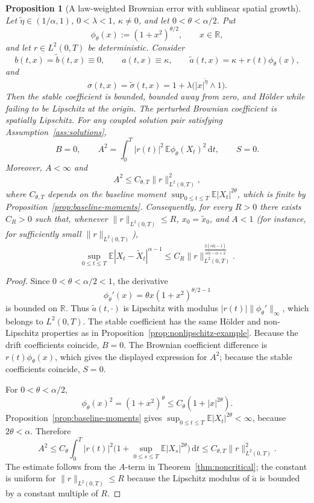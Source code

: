 \documentclass[10pt,a4paper]{amsart}
\newtheorem{proposition}[theorem]{Proposition}
\newcommand{\R}{\mathbb{R}}
\newcommand{\E}{\mathbb{E}}
\newcommand{\1}{\mathbf{1}}
\newcommand{\dd}{\,\mathrm{d}}
\newcommand{\wt}{\tilde}
\begin{document}
\begin{proposition}[A law-weighted Brownian error with sublinear spatial growth]\label{prop:mixed-tail-brownian-error}
Let $\wt\eta\in(1/\alpha,1)$, $0<\lambda<1$, $\kappa\ne0$, and let $0<\theta<\alpha/2$. Put
\[
  \phi_\theta(x):=(1+x^2)^{\theta/2},\qquad x\in\R,
\]
and let $r\in L^2(0,T)$ be deterministic. Consider
\[
  b(t,x)=\wt b(t,x)\equiv0,
  \qquad
  a(t,x)\equiv\kappa,
  \qquad
  \wt a(t,x)=\kappa+r(t)\phi_\theta(x),
\]
and
\[
  \sigma(t,x)=\wt\sigma(t,x)=1+\lambda\bigl(|x|^{\wt\eta}\wedge1\bigr).
\]
Then the stable coefficient is bounded, bounded away from zero, and H\"older while failing to be Lipschitz at the origin. The perturbed Brownian coefficient is spatially Lipschitz. For any coupled solution pair satisfying Assumption~\ref{ass:solutions},
\[
  B=0,
  \qquad
  A^2=\int_0^T |r(t)|^2\,\E \phi_\theta(X_t)^2\dd t,
  \qquad
  S=0.
\]
Moreover, $A<\infty$ and
\[
  A^2\le C_{\theta,T}\|r\|_{L^2(0,T)}^2,
\]
where $C_{\theta,T}$ depends on the baseline moment $\sup_{0\le t\le T}\E|X_t|^{2\theta}$, which is finite by Proposition~\ref{prop:baseline-moments}. Consequently, for every $R>0$ there exists $C_R>0$ such that, whenever $\|r\|_{L^2(0,T)}\le R$, $x_0=\wt x_0$, and $A<1$ (for instance, for sufficiently small $\|r\|_{L^2(0,T)}$),
\[
  \sup_{0\le t\le T}\E|X_t-\wt X_t|^{\alpha-1}
  \le C_R\|r\|_{L^2(0,T)}^{\frac{2(\alpha\wt\eta-1)}{\alpha\wt\eta-\alpha+2}}.
\]
\end{proposition}

\begin{proof}
Since $0<\theta<\alpha/2<1$, the derivative
\[
  \phi_\theta'(x)=\theta x(1+x^2)^{\theta/2-1}
\]
is bounded on $\R$. Thus $\wt a(t,\cdot)$ is Lipschitz with modulus $|r(t)|\|\phi_\theta'\|_\infty$, which belongs to $L^2(0,T)$. The stable coefficient has the same H\"older and non-Lipschitz properties as in Proposition~\ref{prop:nonlipschitz-example}. Because the drift coefficients coincide, $B=0$. The Brownian coefficient difference is $r(t)\phi_\theta(x)$, which gives the displayed expression for $A^2$; because the stable coefficients coincide, $S=0$.

For $0<\theta<\alpha/2$,
\[
  \phi_\theta(x)^2=(1+x^2)^\theta\le C_\theta(1+|x|^{2\theta}).
\]
Proposition~\ref{prop:baseline-moments} gives $\sup_{0\le t\le T}\E|X_t|^{2\theta}<\infty$, because $2\theta<\alpha$. Therefore
\[
  A^2\le C_\theta\int_0^T |r(t)|^2\bigl(1+\sup_{0\le s\le T}\E|X_s|^{2\theta}\bigr)\dd t
  \le C_{\theta,T}\|r\|_{L^2(0,T)}^2.
\]
The estimate follows from the $A$-term in Theorem~\ref{thm:noncritical}; the constant is uniform for $\|r\|_{L^2(0,T)}\le R$ because the Lipschitz modulus of $\wt a$ is bounded by a constant multiple of $R$.
\end{proof}
\end{document}
